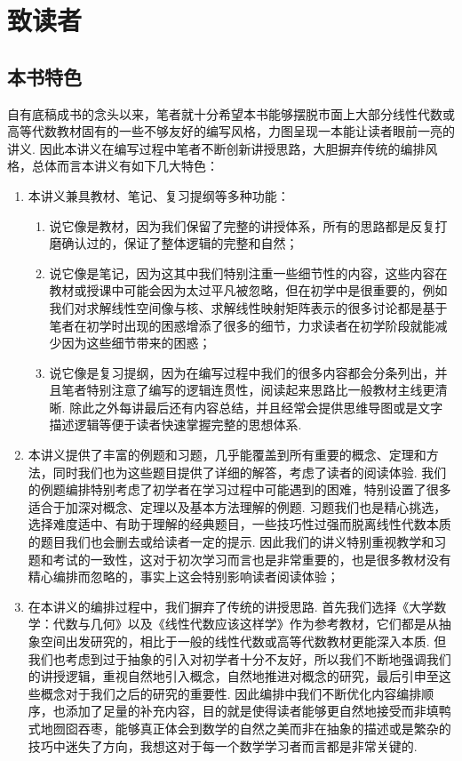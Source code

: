 \chapter*{致读者}

\section*{本书特色}

自有底稿成书的念头以来，笔者就十分希望本书能够摆脱市面上大部分线性代数或高等代数教材固有的一些不够友好的编写风格，力图呈现一本能让读者眼前一亮的讲义. 因此本讲义在编写过程中笔者不断创新讲授思路，大胆摒弃传统的编排风格，总体而言本讲义有如下几大特色：

\begin{enumerate}
    \item 本讲义兼具教材、笔记、复习提纲等多种功能：
          \begin{enumerate}
              \item 说它像是教材，因为我们保留了完整的讲授体系，所有的思路都是反复打磨确认过的，保证了整体逻辑的完整和自然；

              \item 说它像是笔记，因为这其中我们特别注重一些细节性的内容，这些内容在教材或授课中可能会因为太过平凡被忽略，但在初学中是很重要的，例如我们对求解线性空间像与核、求解线性映射矩阵表示的很多讨论都是基于笔者在初学时出现的困惑增添了很多的细节，力求读者在初学阶段就能减少因为这些细节带来的困惑；

              \item 说它像是复习提纲，因为在编写过程中我们的很多内容都会分条列出，并且笔者特别注意了编写的逻辑连贯性，阅读起来思路比一般教材主线更清晰. 除此之外每讲最后还有内容总结，并且经常会提供思维导图或是文字描述逻辑等便于读者快速掌握完整的思想体系.
          \end{enumerate}

    \item 本讲义提供了丰富的例题和习题，几乎能覆盖到所有重要的概念、定理和方法，同时我们也为这些题目提供了详细的解答，考虑了读者的阅读体验. 我们的例题编排特别考虑了初学者在学习过程中可能遇到的困难，特别设置了很多适合于加深对概念、定理以及基本方法理解的例题. 习题我们也是精心挑选，选择难度适中、有助于理解的经典题目，一些技巧性过强而脱离线性代数本质的题目我们也会删去或给读者一定的提示. 因此我们的讲义特别重视教学和习题和考试的一致性，这对于初次学习而言也是非常重要的，也是很多教材没有精心编排而忽略的，事实上这会特别影响读者阅读体验；

    \item 在本讲义的编排过程中，我们摒弃了传统的讲授思路. 首先我们选择《大学数学：代数与几何》以及《线性代数应该这样学》作为参考教材，它们都是从抽象空间出发研究的，相比于一般的线性代数或高等代数教材更能深入本质. 但我们也考虑到过于抽象的引入对初学者十分不友好，所以我们不断地强调我们的讲授逻辑，重视自然地引入概念，自然地推进对概念的研究，最后引申至这些概念对于我们之后的研究的重要性. 因此编排中我们不断优化内容编排顺序，也添加了足量的补充内容，目的就是使得读者能够更自然地接受而非填鸭式地囫囵吞枣，能够真正体会到数学的自然之美而非在抽象的描述或是繁杂的技巧中迷失了方向，我想这对于每一个数学学习者而言都是非常关键的.
\end{enumerate}

